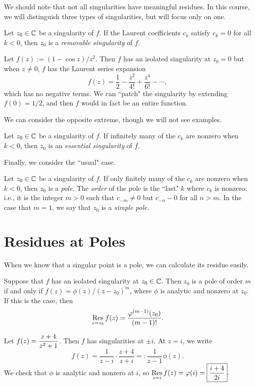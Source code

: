 \documentclass{article}
\begin{document}
We should note that not all singularities have meaningful residues. In this course, we will distinguish three types of singularities, but will focus only on one.
\begin{definition}
Let $z_0\in\mathbb C$ be a singularity of $f$. If the Laurent coefficients $c_k$ satisfy $c_k = 0$ for all $k < 0$, then $z_0$ is a \textit{removable singularity} of $f$.
\end{definition}
\begin{example}
Let $f(z):= (1-\cos z)/z^2$. Then $f$ has an isolated singularity at $z_0 = 0$ but when $z\neq 0$, $f$ has the Laurent series expansion
$$f(z) = \frac 12 - \frac{z^2}{4!} + \frac{z^4}{6!} - \cdots,$$
which has no negative terms. We can ``patch" the singularity by extending $f(0) = 1/2$, and then $f$ would in fact be an entire function.
\end{example}
We can consider the opposite extreme, though we will not see examples.
\begin{definition}
Let $z_0\in\mathbb C$ be a singularity of $f$. If infinitely many of the $c_k$ are nonzero when $k<0$, then $z_0$ is an \textit{essential singularity} of $f$.
\end{definition}
Finally, we consider the ``usual" case.
\begin{definition}
Let $z_0\in\mathbb C$ be a singularity of $f$. If only finitely many of the $c_k$ are nonzero when $k<0$, then $z_0$ is a \textit{pole}. The \textit{order} of the pole is the ``last" $k$ where $c_k$ is nonzero: i.e., it is the integer $m>0$ such that $c_{-m} \neq 0$ but $c_{-n} - 0$ for all $n > m$. In the case that $m=1$, we say that $z_0$ is a \textit{simple pole}.
\end{definition}
\setcounter{section}{97}
\newpage
\section{Residues at Poles}
When we know that a singular point is a pole, we can calculate its residue easily.
\begin{theorem}
Suppose that $f$ has an isolated singularity at $z_0\in \mathbb C$. Then $z_0$ is a pole of order $m$ if and only if $f(z) = \phi(z)/(z-z_0)^m$, where $\phi$ is analytic and nonzero at $z_0$. If this is the case, then
$$\operatorname*{Res}_{z=z_0} f(z) = \frac{\varphi^{(m-1)}(z_0)}{(m - 1)!}.$$
\end{theorem}
\begin{example}
Let $f(z) = \displaystyle\frac{z+4}{z^2+1}$. Then $f$ has singularities at $\pm i$. At $z=i$, we write
$$f(z) = \frac 1{z-i} \cdot \frac{z+4}{z+i} =: \frac 1{z-1}\phi(z).$$
We check that $\phi$ is analytic and nonzero at $i$, so $\displaystyle\operatorname*{Res}_{z=i} f(z) = \varphi(i) = \boxed{\frac{i+4}{2i}}.$
\end{example}
\end{document}
